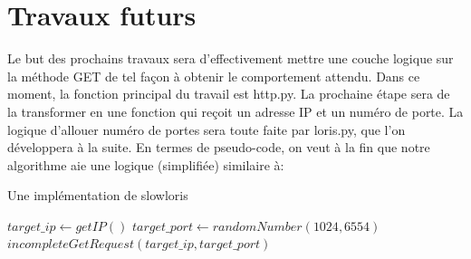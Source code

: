 \documentclass{article}
\begin{document}
\section{Travaux futurs}
Le but des prochains travaux sera d'effectivement mettre une couche logique sur la méthode GET de tel façon
à obtenir le comportement attendu. Dans ce moment, la fonction principal du travail est http.py. La prochaine
étape sera de la transformer en une fonction qui reçoit un adresse IP et un numéro de porte. La logique d'allouer
numéro de portes sera toute faite par loris.py, que l'on développera à la suite. En termes de pseudo-code, on veut
à la fin que notre algorithme aie une logique (simplifiée) similaire à:


\begin{algorithm}
\caption{Une implémentation de slowloris}
\begin{algorithmic}

\STATE $target\_ip \leftarrow getIP()$
\END
{}
\STATE $target\_port \leftarrow randomNumber(1024,6554)$
\STATE $incompleteGetRequest(target\_ip,target\_port)$
\ELSE

\ENDIF

\ENDWHILE
\end{algorithmic}
\end{algorithm}
\end{document}
